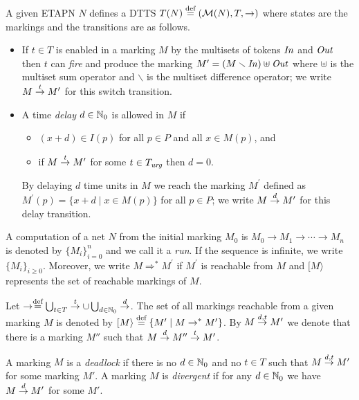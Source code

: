 A given ETAPN $N$ %
defines a DTTS $T(N)\stackrel{\textrm{def}}{=} (\mathcal{M}(N),T,\rightarrow)$
where states are the markings and the transitions are as follows. 
\begin{itemize}
\item If $t\in T$ is enabled in a marking $M$ by the  multisets of
tokens $\mathit{In}$ and $\mathit{Out}$ then $t$ can \emph{fire} and produce 
the marking $M^{\prime} = (M \smallsetminus \mathit{In}) \uplus \mathit{Out}$ 
where  $\uplus$ is the multiset sum operator and $\smallsetminus$ is the multiset 
difference operator; we write $M \stackrel{t}{\rightarrow} M^{\prime}$ for this 
switch transition.
\item A time \emph{delay} $d \in \mathbb{N}_{0}$ is allowed in $M$ if
\begin{itemize}
\item $(x+d) \in I(p)$ for all $p \in P$ and all $x \in M(p)$, and
\item if $M \stackrel{t}{\rightarrow} M'$ for some $t \in T_{\mathit{urg}}$ then $d=0$.
\end{itemize}
By delaying $d$ time units in $M$ we reach the marking $M^{\prime}$ defined as
$M^{\prime}(p) = \{x+d \mid x \in M(p)\}$ for all $p \in P$; 
we write $M \stackrel{d}{\rightarrow} M^{\prime}$ for this delay transition.
\end{itemize}

A computation of a net $N$ from the initial marking $M_0$ is
$M_0 \rightarrow M_1\rightarrow \cdots \rightarrow M_n$ is 
denoted by $\{M_i\}_{i=0}^{n}$ 
and we call it a \emph{run}. If the sequence is infinite, we write 
$\{M_i\}_{i\geq 0}$. Moreover, we write $M \Rightarrow^* M^{\prime}$ if  
$M^{\prime}$ is reachable from $M$ and $[M\rangle$ represents the set of reachable markings of $M$.

\noindent Let 
$\stackrel{}{\rightarrow} \stackrel{\textrm{def}}{=} \bigcup_{t \in T} \stackrel{t}{\rightarrow} \cup \bigcup_{d \in \mathbb{N}_{0}} \stackrel{d}{\rightarrow}$.
The set of all markings reachable %
from a given marking $M$ is denoted by 
$[M\rangle \stackrel{\textrm{def}}{=} \{ M' \mid M \stackrel{}{\rightarrow}^* M' \}$.
By $M \stackrel{d,t}{\rightarrow} M'$ we denote that there is a marking $M''$
such that $M \stackrel{d}{\rightarrow} M'' \stackrel{t}{\rightarrow} M'$.

A marking $M$ is a \emph{deadlock} if there is no $d \in \mathbb{N}_{0}$ and
no $t \in T$ such that $M \stackrel{d,t}{\rightarrow} M'$ 
for some marking $M'$.
A marking $M$ is \emph{divergent} if for any $d \in \mathbb{N}_{0}$
we have $M \stackrel{d}{\rightarrow} M'$ for some $M'$.



